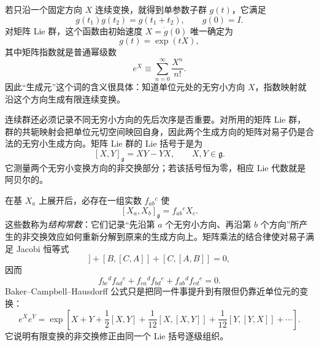 若只沿一个固定方向 $X$ 连续变换，就得到单参数子群 $g(t)$，它满足
\begin{equation}
 g(t_1)g(t_2)=g(t_1+t_2),
 \qquad g(0)=I.
 \label{eq:one-param-group-dp11}
\end{equation}
对矩阵 Lie 群，这个函数由初始速度 $X=\dot g(0)$ 唯一确定为
\begin{equation}
 \boxed{g(t)=\exp(tX),}
 \label{eq:one-param-exp-dp11}
\end{equation}
其中矩阵指数就是普通幂级数
\begin{equation}
 e^X\equiv\sum_{n=0}^{\infty}\frac{X^n}{n!}.
 \label{eq:matrix-exponential-series-dp68}
\end{equation}
因此“生成元”这个词的含义很具体：知道单位元处的无穷小方向 $X$，指数映射就沿这个方向生成有限连续变换。

连续群还必须记录不同无穷小方向的先后次序是否重要。对所用的矩阵 Lie 群，群的共轭映射会把单位元切空间映回自身，因此两个生成方向的矩阵对易子仍是合法的无穷小生成方向。矩阵 Lie 群的 Lie 括号于是为
\begin{equation}
 \boxed{[X,Y]_{\mathfrak g}=XY-YX,\qquad X,Y\in\mathfrak g.}
 \label{eq:matrix-lie-bracket-math-dp76}
\end{equation}
它测量两个无穷小变换方向的非交换部分；若该括号恒为零，相应 Lie 代数就是阿贝尔的。

在基 $X_a$ 上展开后，必存在一组实数 $f_{ab}{}^c$ 使
\begin{equation}
 \boxed{[X_a,X_b]_{\mathfrak g}=f_{ab}{}^cX_c.}
 \label{eq:lie-algebra-general-dp11}
\end{equation}
这些数称为\emph{结构常数}：它们记录“先沿第 $a$ 个无穷小方向、再沿第 $b$ 个方向”所产生的非交换效应如何重新分解到原来的生成方向上。矩阵乘法的结合律使对易子满足 Jacobi 恒等式
\begin{equation}
 [A,[B,C]]+[B,[C,A]]+[C,[A,B]]=0,
 \label{eq:commutator-jacobi-dp68}
\end{equation}
因而
\begin{equation}
 \boxed{
 f_{bc}{}^{d}f_{ad}{}^{e}
 +f_{ca}{}^{d}f_{bd}{}^{e}
 +f_{ab}{}^{d}f_{cd}{}^{e}=0.}
 \label{eq:jacobi-structure-dp11}
\end{equation}
Baker--Campbell--Hausdorff 公式只是把同一件事提升到有限但仍靠近单位元的变换：
\begin{equation}
 e^Xe^Y
 =\exp\!\left[
 X+Y+\frac12[X,Y]
 +\frac1{12}[X,[X,Y]]+\frac1{12}[Y,[Y,X]]+\cdots
 \right].
 \label{eq:bch-lie-dp11}
\end{equation}
它说明有限变换的非交换修正由同一个 Lie 括号逐级组织。

